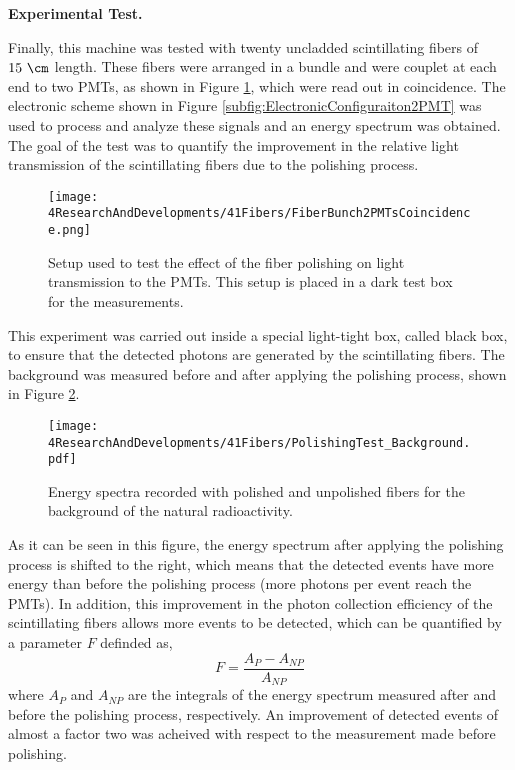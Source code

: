 \textbf{Experimental Test.}

Finally, this machine was tested with twenty uncladded scintillating fibers of $15~\cm$ length. These fibers were arranged in a bundle and were couplet at each end to two PMTs, as shown in Figure \ref{fig:BunchWith2PMTsCoincidence}, which were read out in coincidence. The electronic scheme shown in Figure \ref{subfig:ElectronicConfiguraiton2PMT} was used to process and analyze these signals and an energy spectrum was obtained. The goal of the test was to quantify the improvement in the relative light transmission of the scintillating fibers due to the polishing process.

\begin{figure}[]
\centering
\texttt{[image: 4ResearchAndDevelopments/41Fibers/FiberBunch2PMTsCoincidence.png]}
\caption{Setup used to test the effect of the fiber polishing on light transmission to the PMTs. This setup is placed in a dark test box for the measurements.\label{fig:BunchWith2PMTsCoincidence}}
\end{figure}

This experiment was carried out inside a special light-tight box, called black box, to ensure that the detected photons are generated by the scintillating fibers. The background was measured before and after applying the polishing process, shown in Figure \ref{fig:ResultsOfPolishingMachineBackground}.

\begin{figure}[]
\centering
\texttt{[image: 4ResearchAndDevelopments/41Fibers/PolishingTest\_Background.pdf]}
\caption{Energy spectra recorded with polished and unpolished fibers for the background of the natural radioactivity.\label{fig:ResultsOfPolishingMachineBackground}}
\end{figure}

As it can be seen in this figure, the energy spectrum after applying the polishing process is shifted to the right, which means that the detected events have more energy than before the polishing process (more photons per event reach the PMTs). In addition, this improvement in the photon collection efficiency of the scintillating fibers allows more events to be detected, which can be quantified by a parameter $F$ definded as,
\begin{equation}
F=\frac{A_{P}-A_{NP}}{A_{NP}}
\label{eq:RelativeImprovement}
\end{equation}
where $A_{P}$ and $A_{NP}$ are the integrals of the energy spectrum measured after and before the polishing process, respectively. An improvement of detected events of almost a factor two was acheived with respect to the measurement made before polishing.

